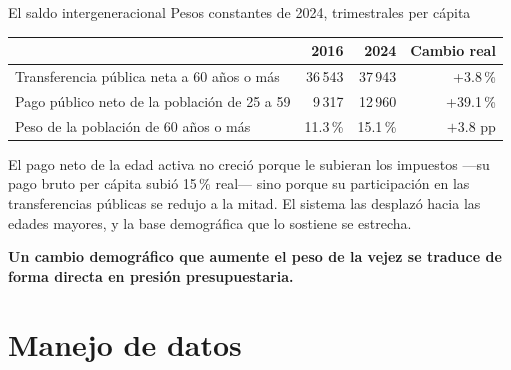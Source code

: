 \documentclass[aspectratio=169,11pt]{beamer}
\newcommand{\bajada}[1]{{\small\textcolor{gris}{#1}}\vspace{0.5em}}
\newcommand{\cierre}[1]{%
  \vfill{\small\textcolor{acento}{\textbf{#1}}}}
\begin{document}
\begin{frame}{El saldo intergeneracional}
\bajada{Pesos constantes de 2024, trimestrales per cápita}

\begin{center}
\begin{tabular}{lrrr}
\toprule
 & 2016 & 2024 & Cambio real \\
\midrule
Transferencia pública neta a 60 años o más & 36\,543 & 37\,943 & +3.8\,\% \\
Pago público neto de la población de 25 a 59 & 9\,317 & 12\,960 & +39.1\,\% \\
\addlinespace
Peso de la población de 60 años o más & 11.3\,\% & 15.1\,\% & $+3.8$ pp \\
\bottomrule
\end{tabular}
\end{center}

\vspace{0.6em}
El pago neto de la edad activa no creció porque le subieran los impuestos ---su pago bruto per
cápita subió 15\,\% real--- sino porque su participación en las transferencias públicas se redujo
a la mitad. El sistema las desplazó hacia las edades mayores, y la base demográfica que lo sostiene
se estrecha.

\cierre{Un cambio demográfico que aumente el peso de la vejez se traduce de forma directa en
presión presupuestaria.}
\end{frame}

\section{Manejo de datos}
\end{document}
